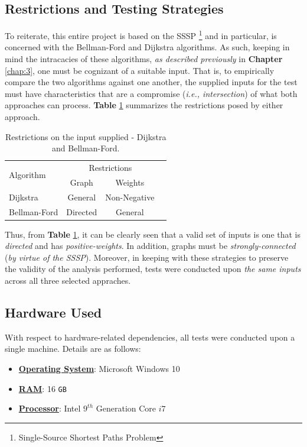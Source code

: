 \documentclass[a4paper, 12pt]{report}
\theoremstyle{definition}
\begin{document}
\subsection{Restrictions and Testing Strategies}
\label{sec:5.1.2}
To reiterate, this entire project is based on the SSSP \footnote{Single-Source Shortest Paths Problem} and in particular, is concerned with the Bellman-Ford and Dijkstra algorithms. As such, keeping in mind the intracacies of these algorithms, \emph{as described previously} in
\textbf{Chapter} \ref{chap:3}, one must be cognizant of a suitable input. That is, to empirically compare the two algorithms against one another, the supplied inputs for the test must have characteristics that are a compromise (\emph{i.e., intersection})
of what both approaches can process. \textbf{Table} \ref{tab3:restrictions} summarizes the restrictions posed by either approach.

\begin{table}[H]
  \begin{center}
    \begin{tabular}{|l|*{3}{c|}}
      \hline
      \multirow{2}{8em}{Algorithm} & \multicolumn{2}{|c|}{Restrictions} \\ \cline{2-3}
      & \footnotesize Graph & \footnotesize Weights  \\ \hline
      Dijkstra & \cellcolor{blue!25} General & \cellcolor{red!25} Non-Negative \\ \hline
      Bellman-Ford & \cellcolor{red!25} Directed & \cellcolor{blue!25} General\\
      \hline
    \end{tabular}
  \end{center}
  \caption{Restrictions on the input supplied - Dijkstra and Bellman-Ford.}
  \label{tab3:restrictions}
\end{table}

Thus, from \textbf{Table} \ref{tab3:restrictions}, it can be clearly seen that a valid set of inputs is one that is \emph{directed} and has \emph{positive-weights}. In addition, graphs must be \emph{strongly-connected} (\emph{by virtue of the SSSP}). 
Moreover, in keeping with these strategies to preserve the validity of the analysis performed, tests were conducted upon \emph{the same inputs} across all three selected appraches.

\subsection{Hardware Used}
With respect to hardware-related dependencies, all tests were conducted upon a single machine. Details are as follows:
\begin{itemize}
  \item \underline{\textbf{Operating System}}: Microsoft Windows 10
  \item \underline{\textbf{RAM}}: 16 \texttt{GB}
  \item \underline{\textbf{Processor}}: Intel $9^{th}$ Generation Core \(i7\)
\end{itemize}
\end{document}
